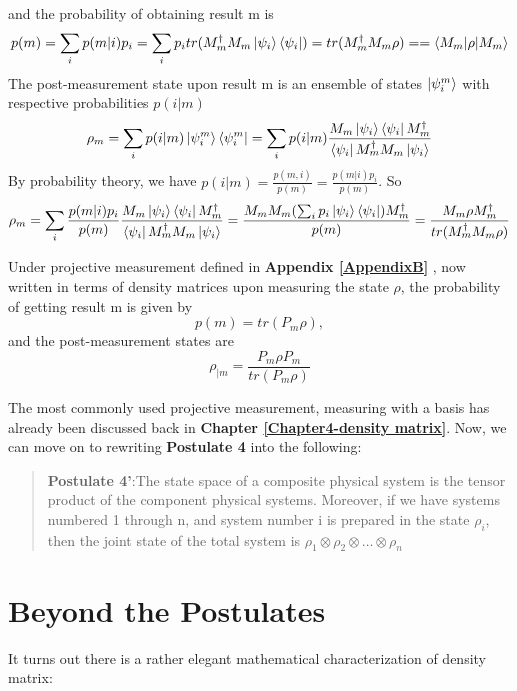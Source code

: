     and the probability of obtaining result m is
    \begin{equation}
        p(m)=\sum_i p(m|i)p_i=\sum_i p_i tr(M_m^\dagger M_m \ket{\psi_i}\bra{\psi_i})=tr(M_m^\dagger M_m \rho)==\braket{M_m| \rho |M_m}
    \end{equation}
    The post-measurement state upon result m is an ensemble of states $\ket{\psi_i^m}$ with respective probabilities $p(i|m)$
    \begin{equation}
        \rho_m = \sum_i p(i|m)\ket{\psi_i^m}\bra{\psi_i^m}=\sum_i p(i|m)\frac{M_m \ket{\psi_i}\bra{\psi_i}M_m^\dagger}{\bra{\psi_i}M_m^\dagger M_m \ket{\psi_i}}
    \end{equation}
    By probability theory, we have $p(i|m)=\frac{p(m,i)}{p(m)}=\frac{p(m|i)p_i}{p(m)}$. So
    \begin{equation}
        \rho_m=\sum_i \frac{p(m|i)p_i}{p(m)}\frac{M_m \ket{\psi_i}\bra{\psi_i}M_m^\dagger}{\bra{\psi_i}M_m^\dagger M_m \ket{\psi_i}}=\frac{M_m M_m (\sum_i p_i \ket{\psi_i}\bra{\psi_i})M_m^\dagger}{p(m)}=\frac{M_m \rho M_m^\dagger}{tr(M_m^\dagger M_m \rho)}
    \end{equation}

\bigskip
Under projective measurement defined in \textbf{Appendix \ref{AppendixB}}
, now written in terms of density matrices upon measuring the state $\rho$, the probability of getting result m is given by
\begin{equation}
    p(m)=tr(P_m \rho),
\end{equation}
and the post-measurement states are
\begin{equation}
    \rho_{|m}=\frac{P_m \rho P_m}{tr(P_m \rho)}
\end{equation}

The most commonly used projective measurement, measuring with a basis has already been discussed back in \textbf{Chapter \ref{Chapter4-density matrix}}. Now, we can move on to rewriting \textbf{Postulate 4} into the following:

\bigskip
\begin{quote}
    \textbf{Postulate 4'}:The state space of a composite physical system is the tensor product of the component physical systems. Moreover, if we have systems numbered 1 through n, and system number i is prepared in the state $\rho_i$, then the joint state of the total system is $\rho_1 \otimes \rho_2 \otimes \hdots \otimes \rho_n$
\end{quote}

\section{Beyond the Postulates}
It turns out there is a rather elegant mathematical characterization of density matrix:

